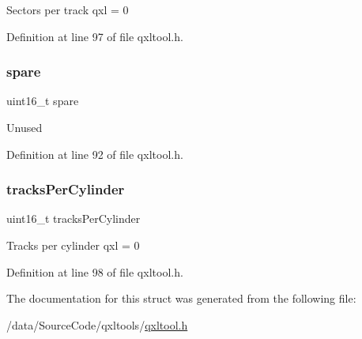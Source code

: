 Sectors per track qxl = 0 

Definition at line 97 of file qxltool.\+h.

\mbox{\label{struct_h_e_a_d_e_r_ae186db2aeadfd250f02cd5a4cce4054f}} 
\subsubsection{\texorpdfstring{spare}{spare}}
{\footnotesize\ttfamily uint16\+\_\+t spare}

Unused 

Definition at line 92 of file qxltool.\+h.

\mbox{\label{struct_h_e_a_d_e_r_a583b97c33089d32720d81b800855ef34}} 
\subsubsection{\texorpdfstring{tracks\+Per\+Cylinder}{tracksPerCylinder}}
{\footnotesize\ttfamily uint16\+\_\+t tracks\+Per\+Cylinder}

Tracks per cylinder qxl = 0 

Definition at line 98 of file qxltool.\+h.



The documentation for this struct was generated from the following file\+:\begin{DoxyCompactItemize}
\item 
/data/\+Source\+Code/qxltools/\hyperlink{qxltool_8h}{qxltool.\+h}\end{DoxyCompactItemize}
